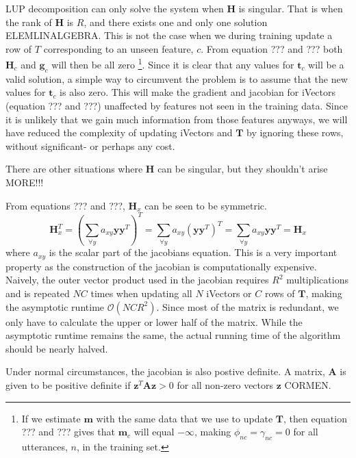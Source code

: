 LUP decomposition can only solve the system when $\mathbf{H}$ is singular. That is when the rank of $\mathbf{H}$ is $R$, and there exists one and only one solution ELEMLINALGEBRA. This is not the case when we during training update a row of $T$ corresponding to an unseen feature, $c$. From equation ??? and ??? both $\mathbf{H}_c$ and $\mathbf{g}_c$ will then be all zero \footnote{If we estimate $\mathbf{m}$ with the same data that we use to update $\mathbf{T}$, then equation ??? and ??? gives that $\mathbf{m}_c$ will equal $-\infty$, making $\phi_{nc}=\gamma_{nc}=0$ for all utterances, $n$, in the training set.}. Since it is clear that any values for $\mathbf{t}_c$ will be a valid solution, a simple way to circumvent the problem is to assume that the new values for $\mathbf{t}_c$ is also zero. This will make the gradient and jacobian for iVectors (equation ??? and ???) unaffected by features not seen in the training data. Since it is unlikely that we gain much information  from those features anyways, we will have reduced the complexity of updating iVectors and $\mathbf{T}$ by ignoring these rows, without significant- or perhaps any cost.

There are other situations where $\mathbf{H}$ can be singular, but they shouldn't arise MORE!!!


From equations ??? and ???, $\mathbf{H}_x$ can be seen to be symmetric.
\begin{equation}\label{symproof}
\mathbf{H}_x^T = \left(\sum_{\forall y}a_{xy}\mathbf{y}\mathbf{y}^T\right)^T = 
\sum_{\forall y}a_{xy}\left(\mathbf{y}\mathbf{y}^T\right)^T =
 \sum_{\forall y}a_{xy}\mathbf{y}\mathbf{y}^T = \mathbf{H}_x
\end{equation}
where $a_{xy}$ is the scalar part of the jacobians equation. This is a very important property as the construction of the jacobian is computationally expensive. Naively, the outer vector product used in the jacobian requires $R^2$ multiplications and is repeated $NC$ times when updating all $N$ iVectors or $C$ rows of $\mathbf{T}$, making the asymptotic runtime $\mathcal{O}(NCR^2)$.  Since most of the matrix is redundant, we only have to calculate the upper or lower half of the matrix. While the asymptotic runtime remains the same, the actual running time of the algorithm should be nearly halved.

Under normal circumstances, the jacobian is also postive definite. A matrix, $\mathbf{A}$ is given to be positive definite if $\mathbf{z}^T\mathbf{Az} > 0$ for all non-zero vectors $\mathbf{z}$ CORMEN. 

